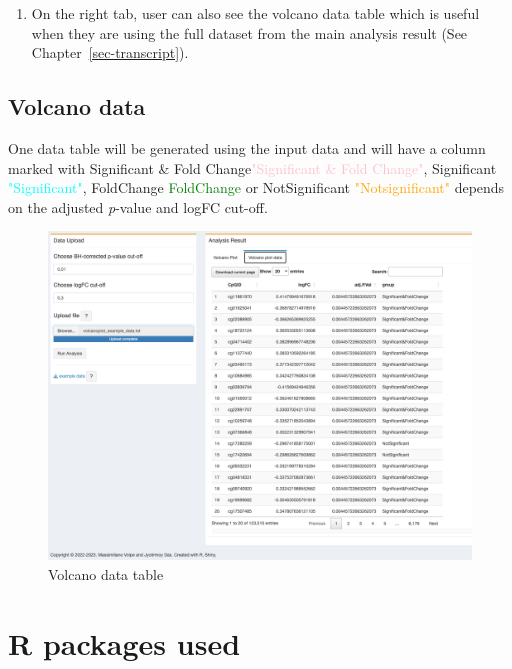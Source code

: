 \documentclass[
  a4paper,
  oneside,
  open=any]{scrreport}
\providecommand{\tightlist}{%
  \setlength{\itemsep}{0pt}\setlength{\parskip}{0pt}}\usepackage{longtable,booktabs,array}
\begin{document}
\begin{enumerate}
\def\labelenumi{\arabic{enumi}.}
\setcounter{enumi}{2}
\tightlist
\item
  On the right tab, user can also see the volcano data table which is
  useful when they are using the full dataset from the main analysis
  result (See Chapter~\ref{sec-transcript}).
\end{enumerate}

\hypertarget{volcano-data}{%
\subsection{Volcano data}\label{volcano-data}}

One data table will be generated using the input data and will have a
column marked with {Significant \& Fold
Change}\textcolor{pink}{"Significant \& Fold Change"}, {Significant}
\textcolor{cyan}{"Significant"}, {FoldChange}
\textcolor{green}{FoldChange} or {NotSignificant}
\textcolor{orange}{"Notsignificant"} depends on the adjusted
\emph{p}-value and logFC cut-off.\\

\begin{figure}[H]

{\centering \includegraphics{./_images/Volcano2.png}

}

\caption{Volcano data table}

\end{figure}

\hypertarget{r-packages-used-1}{%
\section{R packages used}\label{r-packages-used-1}}
\end{document}
